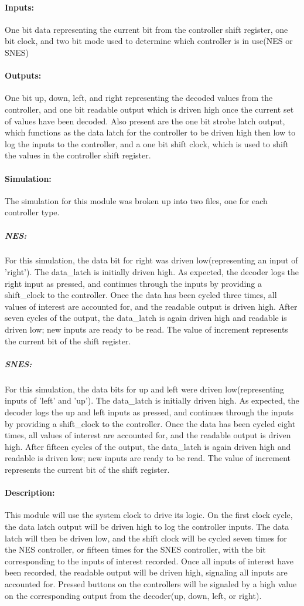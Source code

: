 \documentclass[]{article}
\begin{document}
\paragraph{Inputs:} One bit data representing the current bit from the controller shift register, one bit clock, and two bit mode used to determine which controller is in use(NES or SNES)
\paragraph{Outputs:} One bit up, down, left, and right representing the decoded values from the controller, and one bit readable output which is driven high once the current set of values have been decoded. Also present are the one bit strobe latch output, which functions as the data latch for the controller to be driven high then low to log the inputs to the controller, and a one bit shift clock, which is used to shift the values in the controller shift register.
\paragraph{Simulation:} The simulation for this module was broken up into two files, one for each controller type.
\subparagraph{NES:} For this simulation, the data bit for right was driven low(representing an input of 'right'). The data\_latch is initially driven high.
As expected, the decoder logs the right input as pressed, and continues through the inputs by providing a shift\_clock to the controller.
Once the data has been cycled three times, all values of interest are accounted for, and the readable output is driven high.
After seven cycles of the output, the data\_latch is again driven high and readable is driven low; new inputs are ready to be read.
The value of increment represents the current bit of the shift register.
\subparagraph{SNES:} For this simulation, the data bits for up and left were driven low(representing inputs of 'left' and 'up').
The data\_latch is initially driven high. As expected, the decoder logs the up and left inputs as pressed,
and continues through the inputs by providing a shift\_clock to the controller.
Once the data has been cycled eight times, all values of interest are accounted for, and the readable output is driven high.
After fifteen cycles of the output, the data\_latch is again driven high and readable is driven low; new inputs are ready to be read.
The value of increment represents the current bit of the shift register.
\paragraph{Description:} This module will use the system clock to drive its logic. On the first clock cycle,
the data latch output will be driven high to log the controller inputs. The data latch will then be driven low,
and the shift clock will be cycled seven times for the NES controller, or fifteen times for the SNES controller,
with the bit corresponding to the inputs of interest recorded. Once all inputs of interest have been recorded,
the readable output will be driven high, signaling all inputs are accounted for.
Pressed buttons on the controllers will be signaled by a high value on the corresponding output from the decoder(up, down, left, or right). 
\end{document}
